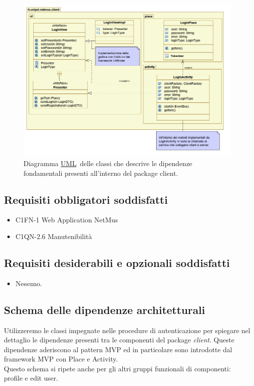\begin{figure}[!h]
  \centering
  \includegraphics[width=14cm]{img/DP/package.png}
\caption{Diagramma \underline{UML}\ delle classi che descrive le dipendenze
fondamentali presenti all'interno del package client.}
\end{figure}

\subsection*{Requisiti obbligatori soddisfatti}
\begin{itemize}
	\item C1FN-1 Web Application NetMus
	\item C1QN-2.6 Manutenibilit\`a
\end{itemize}
\subsection*{Requisiti desiderabili e opzionali soddisfatti}
\begin{itemize}
    \item Nessuno.
\end{itemize}
\subsection*{Schema delle dipendenze architetturali}
Utilizzeremo le classi impegnate nelle procedure di autenticazione per spiegare
nel dettaglio le dipendenze presenti tra le componenti del package
\emph{client}. 
Queste dipendenze aderiscono al pattern MVP ed in particolare sono introdotte
dal framework MVP con Place e Activity.\\
Questo schema si ripete anche per gli altri gruppi funzionali di componenti:
profile e edit user.



